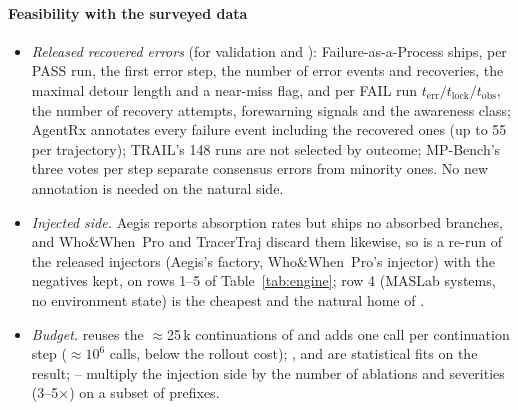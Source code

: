 \documentclass[10pt,a4paper]{article}
\begin{document}
\paragraph{Feasibility with the surveyed data}
\begin{itemize}[leftmargin=1.1em]
\item \emph{Released recovered errors} (for  validation and ): Failure-as-a-Process ships, per PASS run, the first error step, the number of error events and recoveries, the maximal detour length and a near-miss flag, and per FAIL run $t_{\mathrm{err}}/t_{\mathrm{lock}}/t_{\mathrm{obs}}$, the number of recovery attempts, forewarning signals and the awareness class; AgentRx annotates every failure event including the recovered ones (up to 55 per trajectory); TRAIL's 148 runs are not selected by outcome; MP-Bench's three votes per step separate consensus errors from minority ones. No new annotation is needed on the natural side.
\item \emph{Injected side.} Aegis reports absorption rates but ships no absorbed branches, and Who\&When~Pro and TracerTraj discard them likewise, so  is a re-run of the released injectors (Aegis's factory, Who\&When~Pro's injector) with the negatives kept, on rows 1--5 of Table~\ref{tab:engine}; row 4 (MASLab systems, no environment state) is the cheapest and the natural home of .
\item \emph{Budget.}  reuses the $\approx$25\,k continuations of  and adds one call per continuation step ($\approx10^6$ calls, below the rollout cost); ,  and  are statistical fits on the result; -- multiply the injection side by the number of ablations and severities (3--5$\times$) on a subset of prefixes.
\end{itemize}
\end{document}
